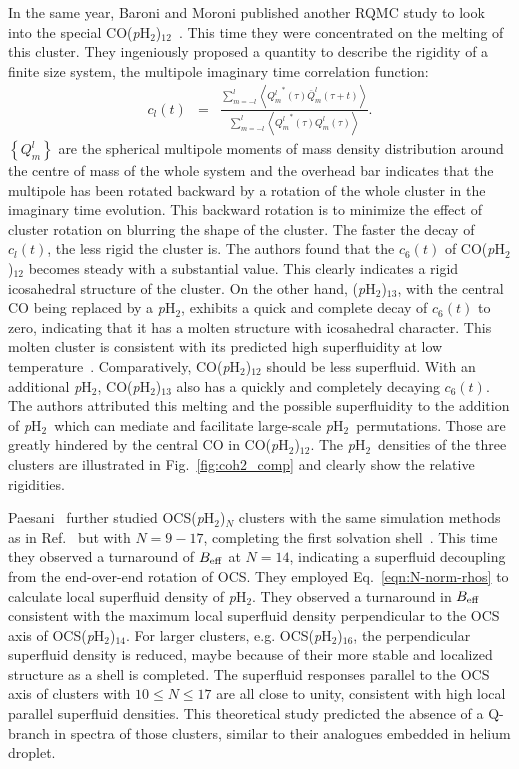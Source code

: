 \documentclass[12pt]{iopart}
\newcommand{\phtwo}{{\em p}H$_2$}
\begin{document}
In the same year, Baroni and Moroni published another RQMC study to look into the special CO(\phtwo)$_{12}$~\cite{moroni_pH2_melting}. 
This time they were concentrated on the melting of this cluster. 
They ingeniously proposed a quantity to describe the rigidity of a finite size system, 
the multipole imaginary time correlation function:
\begin{eqnarray}
c_l\left( t\right)&=&\frac{\sum_{m=-l}^l\left< {Q^l_m}^*\left(\tau\right)\bar{Q}^l_m\left( \tau+t \right) \right>}{\sum_{m=-l}^l \left<{Q^l_m}^*\left(\tau\right)Q^l_m\left(\tau \right)\right>}.
\end{eqnarray}
$\left\{Q^l_m\right\}$ are the spherical multipole moments of mass density distribution around the centre of mass of the whole system and the overhead bar indicates that the multipole has been rotated backward by a rotation of the whole cluster in the imaginary time evolution. 
This backward rotation is to minimize the effect of cluster rotation on blurring the shape of the cluster. 
The faster the decay of $c_l\left( t\right)$, the less rigid the cluster is. 
The authors found that the $c_6\left(t \right)$ of CO(\phtwo)$_{12}$ becomes steady with a substantial value. 
This clearly indicates a rigid icosahedral structure of the cluster. 
On the other hand, (\phtwo)$_{13}$, with the central CO being replaced by a \phtwo, exhibits a quick and complete decay of $c_6\left(t \right)$ to zero, indicating that it has a molten structure with icosahedral character. 
This molten cluster is consistent with its predicted high superfluidity at low temperature~\cite{sindzingre_pH2_superfluid}. Comparatively, CO(\phtwo)$_{12}$ should be less superfluid. With an additional \phtwo, CO(\phtwo)$_{13}$ also has a quickly and completely decaying $c_6\left(t \right)$. 
The authors attributed this melting and the possible superfluidity to the addition of \phtwo~which can mediate and facilitate large-scale \phtwo~permutations. Those are greatly hindered by the central CO in CO(\phtwo)$_{12}$.
The \phtwo~densities of the three clusters are illustrated in Fig.~\ref{fig:coh2_comp} and clearly show the relative rigidities.

Paesani \etal~further studied OCS(\phtwo)$_N$ clusters with the same simulation methods as in Ref.~\cite{paesani_ocs_ph2_1-8} but with $N=9-17$, completing the first solvation shell~\cite{paesani_OCS_pH2}. 
This time they observed a turnaround of $B_{\rm eff}$ at $N=14$, indicating a superfluid decoupling from the end-over-end rotation of OCS. 
They employed Eq.~\ref{eqn:N-norm-rhos} to calculate local superfluid density of \phtwo. 
They observed a turnaround in $B_{\rm eff}$  consistent with the maximum local superfluid density perpendicular to the OCS axis of OCS(\phtwo)$_{14}$.
For larger clusters, e.g. OCS(\phtwo)$_{16}$, the perpendicular superfluid density is reduced, 
maybe because of their more stable and localized structure as a shell is completed. 
The superfluid responses parallel to the OCS axis of clusters with $10\le N\le 17$ are all close to unity, 
consistent with high local parallel superfluid densities. 
This theoretical study predicted the absence of a Q-branch in spectra of those clusters, 
similar to their analogues embedded in helium droplet.
\end{document}
